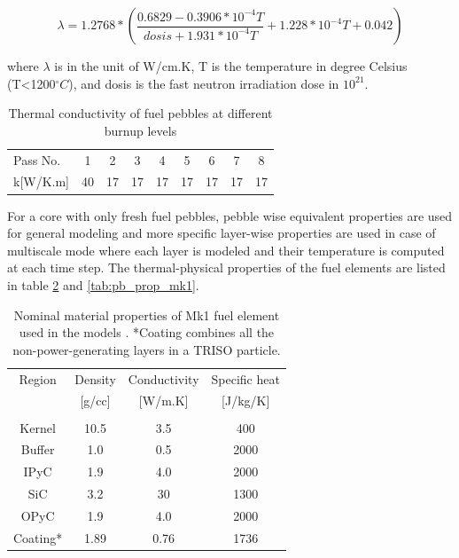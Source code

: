 \documentclass{elsarticle}
\begin{document}
\begin{equation}
  \lambda = 1.2768*(\frac{0.6829-0.3906*10^{-4}T}{dosis+1.931*10^{-4}T}+1.228*10^{-4}T + 0.042)
  \label{eq:k_pb_mk1}
\end{equation}

where $\lambda$ is in the unit of W/cm.K, T is the temperature in degree Celsius (T<1200$^{\circ}C$), and dosis is the fast neutron irradiation dose in $10^{21}$.



\begin{table}[h]
    \centering
    \begin{tabular}{lcccccccc}
         Pass No. & 1 & 2 & 3 & 4 & 5 & 6 & 7 & 8  \\
         k[W/K.m] & 40 & 17 & 17 & 17 & 17 & 17 & 17 & 17 \\ 
    \end{tabular}
    \caption{Thermal conductivity of fuel pebbles at different burnup levels}
    \label{tab:k_bu}
\end{table}





 For a core with only fresh fuel pebbles, pebble wise equivalent properties are used for general modeling and more specific layer-wise properties are used in case of multiscale mode where each layer is modeled and their temperature is computed at each time step. The thermal-physical properties of the fuel elements are listed in table \ref{tab:triso_prop_mk1} and \ref{tab:pb_prop_mk1}.


\begin{table}[h]
  \centering
  \begin{tabular}{cccc}
    Region&Density&Conductivity&Specific heat\\
    &[g/cc]&[W/m.K]&[J/kg/K]\\
    \hline\\
    Kernel & 10.5 & 3.5 & 400\\
    Buffer & 1.0 & 0.5 & 2000\\
    IPyC & 1.9 & 4.0 & 2000\\
    SiC & 3.2 & 30 & 1300\\
    OPyC & 1.9 & 4.0 & 2000\\
    Coating* & 1.89 & 0.76 & 1736\\
  \end{tabular}
  \caption{Nominal material properties of Mk1 fuel element used in the models \cite{Hu2010}\cite{FHR2013}. *Coating combines all the non-power-generating layers in a TRISO particle.}
  \label{tab:triso_prop_mk1}
\end{table}
\end{document}
